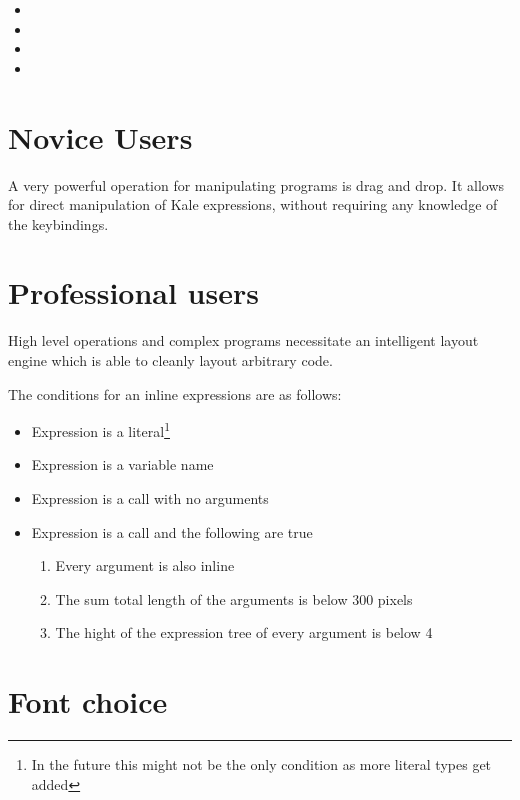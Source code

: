 \documentclass[11pt]{report}
\begin{document}
\begin{itemize}[noitemsep]
	\item {} \keys{\backspace}
	\item {} 
	\item {} 
	\item {} 
\end{itemize}


\section{Novice Users}
A very powerful operation for manipulating programs is drag and drop. It allows
for direct manipulation of Kale expressions, without requiring any knowledge of
the keybindings.

\section{Professional users}


High level operations and complex programs necessitate an intelligent layout
engine which is able to cleanly layout arbitrary code.

The conditions for an inline expressions are as follows:

\begin{itemize}[noitemsep]
	\item Expression is a literal\footnote{In the future this might not be the
only condition as more literal types get added}
	\item Expression is a variable name
	\item Expression is a call with no arguments
	\item Expression is a call and the following are true
	\begin{enumerate}[noitemsep]
		\item Every argument is also inline
		\item The sum total length of the arguments is below 300 pixels
		\item The hight of the expression tree of every argument is below 4
	\end{enumerate}
\end{itemize}

\section{Font choice}
\end{document}
